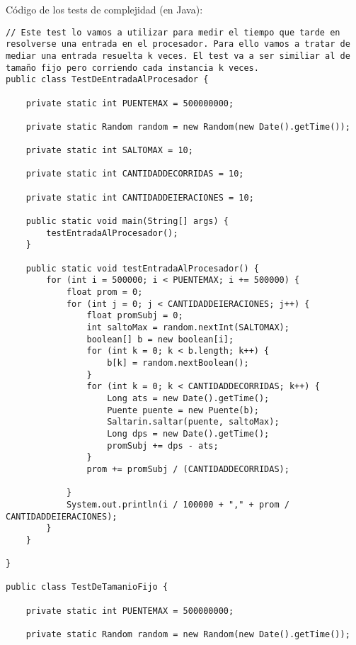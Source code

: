 Código de los tests de complejidad (en Java):
\begin{lstlisting}[frame=single]
// Este test lo vamos a utilizar para medir el tiempo que tarde en resolverse una entrada en el procesador. Para ello vamos a tratar de mediar una entrada resuelta k veces. El test va a ser similiar al de tamaño fijo pero corriendo cada instancia k veces.
public class TestDeEntradaAlProcesador {

    private static int PUENTEMAX = 500000000;

    private static Random random = new Random(new Date().getTime());

    private static int SALTOMAX = 10;

    private static int CANTIDADDECORRIDAS = 10;

    private static int CANTIDADDEIERACIONES = 10;

    public static void main(String[] args) {
        testEntradaAlProcesador();
    }

    public static void testEntradaAlProcesador() {
        for (int i = 500000; i < PUENTEMAX; i += 500000) {
            float prom = 0;
            for (int j = 0; j < CANTIDADDEIERACIONES; j++) {
                float promSubj = 0;
                int saltoMax = random.nextInt(SALTOMAX);
                boolean[] b = new boolean[i];
                for (int k = 0; k < b.length; k++) {
                    b[k] = random.nextBoolean();
                }
                for (int k = 0; k < CANTIDADDECORRIDAS; k++) {
                    Long ats = new Date().getTime();
                    Puente puente = new Puente(b);
                    Saltarin.saltar(puente, saltoMax);
                    Long dps = new Date().getTime();
                    promSubj += dps - ats;
                }
                prom += promSubj / (CANTIDADDECORRIDAS);

            }
            System.out.println(i / 100000 + "," + prom / CANTIDADDEIERACIONES);
        }
    }

}

public class TestDeTamanioFijo {

    private static int PUENTEMAX = 500000000;

    private static Random random = new Random(new Date().getTime());


\end{lstlisting}

